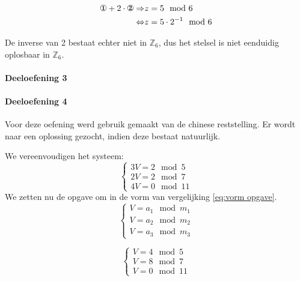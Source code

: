 \documentclass[12pt]{article}
\begin{document}

	\begin{align}
		\text{\ding{172}}+2 \cdot \text{\ding{173}} \Rightarrow & z = 5 \mod 6 \\
		\Leftrightarrow & z = 5 \cdot 2^{-1} \mod 6
	\end{align}

\par De inverse van 2 bestaat echter niet in $\mathbb{Z}_{6}$, dus het stelsel is niet eenduidig oplosbaar in $\mathbb{Z}_{6}$.

	\paragraph{Deeloefening 3}

	\paragraph{Deeloefening 4}
	
    Voor deze oefening werd gebruik gemaakt van de chinese reststelling. Er wordt naar een oplossing gezocht, indien deze bestaat natuurlijk.
    
    We vereenvoudigen het systeem:
	\begin{equation}
        \begin{cases}
            3V = 2 \mod 5 \\
            2V = 2 \mod 7 \\
            4V = 0 \mod 11
        \end{cases}
    \end{equation}
    We zetten nu de opgave om in de vorm van vergelijking \ref{eq:vorm opgave}.
    \begin{equation} \label{eq:vorm opgave}
        \begin{cases}
            V = a_1 \mod m_1 \\
            V = a_2 \mod m_2 \\
            V = a_3 \mod m_3
        \end{cases}
    \end{equation}
    
    \begin{equation}
        \begin{cases}
            V = 4 \mod 5 \\
            V = 8 \mod 7 \\
            V = 0 \mod 11
        \end{cases}
    \end{equation}
    
\end{document}

